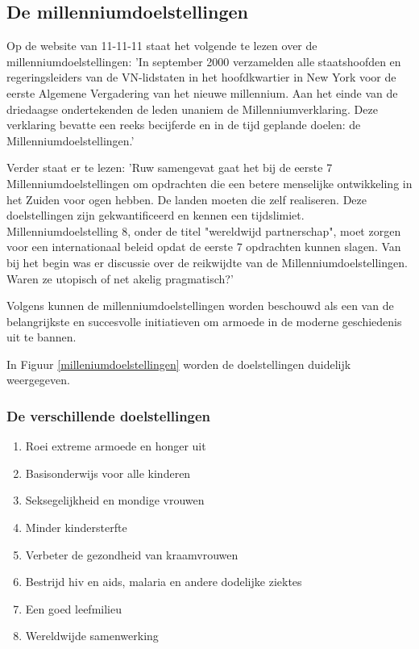\subsection{De millenniumdoelstellingen}
Op de website van 11-11-11 staat het volgende te lezen over de  millenniumdoelstellingen: 'In september 2000 verzamelden alle staatshoofden en regeringsleiders van de VN-lidstaten in het hoofdkwartier in New York voor de eerste Algemene Vergadering van het nieuwe millennium. Aan het einde van de driedaagse ondertekenden de leden unaniem de Millenniumverklaring. Deze verklaring bevatte een reeks becijferde en in de tijd geplande doelen: de Millenniumdoelstellingen.' \autocite{11.11.112019}

Verder staat er te lezen: 'Ruw samengevat gaat het bij de eerste 7 Millenniumdoelstellingen om opdrachten die een betere menselijke ontwikkeling in het Zuiden voor ogen hebben. De landen moeten die zelf realiseren. Deze doelstellingen zijn gekwantificeerd en kennen een tijdslimiet. Millenniumdoelstelling 8, onder de titel "wereldwijd partnerschap", moet zorgen voor een internationaal beleid opdat de eerste 7 opdrachten kunnen slagen. Van bij het begin was er discussie over de reikwijdte van de Millenniumdoelstellingen. Waren ze utopisch of net akelig pragmatisch?'  \autocite{11.11.112019}

Volgens \autocite{Tjoa2016} kunnen de millenniumdoelstellingen worden beschouwd als een van de belangrijkste en succesvolle initiatieven om armoede in de moderne geschiedenis uit te bannen.

In Figuur \ref{milleniumdoelstellingen} worden de doelstellingen duidelijk weergegeven.

 
  \subsubsection{De verschillende doelstellingen}
  \begin{enumerate}
  \item Roei extreme armoede en honger uit
  \item Basisonderwijs voor alle kinderen
  \item Seksegelijkheid en mondige vrouwen
  \item Minder kindersterfte
  \item Verbeter de gezondheid van kraamvrouwen
  \item Bestrijd hiv en aids, malaria en andere dodelijke ziektes
  \item Een goed leefmilieu 
  \item Wereldwijde samenwerking
\end{enumerate}
\autocite{NOS2015}

